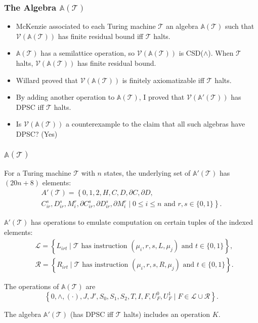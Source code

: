 \documentclass[compress,handout]{beamer}
\newcommand{\V}{\mathcal{V}}
\newcommand{\A}{\mathbb{A}}
\theoremstyle{plain} \newtheorem{thm}{Theorem}
\theoremstyle{definition} \newtheorem{defn}[thm]{Definition}
\theoremstyle{remark} \newtheorem*{rk}{Remark}
\theoremstyle{plain} \newtheorem*{question}{Question}
\newcommand{\T}{\mathcal{T}}
\begin{document}
\begin{frame} \frametitle{The Algebra $\A(\T)$}
\begin{itemize}\setlength{\itemsep}{4ex}
  \item McKenzie associated to each Turing machine $\T$ an algebra $\A(\T)$
  such that $\V(\A(\T))$ has finite residual bound iff $\T$ halts.

  \pause \item $\A(\T)$ has a semilattice operation, so $\V(\A(\T))$ is
  CSD($\wedge$). \pause When $\T$ halts, $\V(\A(\T))$ has finite residual
  bound.

  \pause \item Willard proved that $\V(\A(\T))$ is finitely axiomatizable
  iff $\T$ halts.

  \pause \item By adding another operation to $\A(\T)$, I proved that
  $\V(\A'(\T))$ has DPSC iff $\T$ halts.

  \pause \item Is $\V(\A(\T))$ a counterexample to the claim that all such
  algebras have DPSC? \pause (\alert{Yes})
\end{itemize}
\end{frame}

\begin{frame} \frametitle{$\A(\T)$}
For a Turing machine $\T$ with $n$ states, the underlying set of $\A'(\T)$
has $(20n + 8)$ elements:
\begin{multline*}
  A'(\T) = \left\{ 0,1,2,H,C,D,\partial C, \partial D, \right. \\
  \left. C_{ir}^s, D_{ir}^s, M_i^r, \partial C_{ir}^s, \partial D_{ir}^s, 
    \partial M_i^r \mid 0\leq i\leq n \text{ and } r,s\in \{0,1\} \right\}.
\end{multline*}

\pause

$\A'(\T)$ has operations to emulate computation on certain tuples of the
indexed elements: \pause
\begin{align*}
  & \mathcal{L} = \left\{ L_{irt} \mid \T \text{ has instruction }
    (\mu_i,r,s,L,\mu_j) \text{ and } t\in \{0,1\} \right\}, \\
  & \mathcal{R} = \left\{ R_{irt} \mid \T \text{ has instruction }
    (\mu_i,r,s,R,\mu_j) \text{ and } t\in \{0,1\} \right\}.
\end{align*}

\pause

The operations of $\A(\T)$ are
\[
  \left\{ 0, \wedge, (\cdot), J, J', S_0, S_1, S_2, T, I, F, U_F^0, U_F^1
  \mid F\in \mathcal{L}\cup \mathcal{R} \right\}.
\]

\pause 

The algebra $\A'(\T)$ (has DPSC iff $\T$ halts) includes an operation $K$.
\end{frame}
\end{document}
